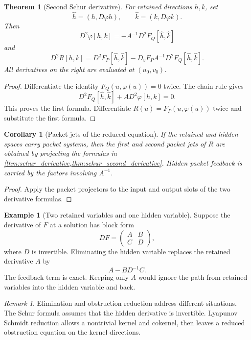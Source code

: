 \documentclass{aomart}
\newtheorem{theorem}{Theorem}[section]
\newtheorem{corollary}[corollary]{Corollary}
\theoremstyle{definition}
\newtheorem{example}[example]{Example}
\theoremstyle{remark}
\newtheorem{remark}[remark]{Remark}
\begin{document}
\begin{theorem}[Second Schur derivative]\label{thm:schur_second_derivative}
For retained directions $h,k$, set
\[
\widehat h=(h,D\varphi h),
\qquad
\widehat k=(k,D\varphi k).
\]
Then
\[
D^2\varphi[h,k]
=
-A^{-1}D^2F_Q[\widehat h,\widehat k]
\]
and
\[
D^2R[h,k]
=
D^2F_P[\widehat h,\widehat k]
-
D_vF_P A^{-1}D^2F_Q[\widehat h,\widehat k].
\]
All derivatives on the right are evaluated at $(u_0,v_0)$.
\end{theorem}

\begin{proof}
Differentiate the identity $F_Q(u,\varphi(u))=0$ twice.  The chain rule gives
\[
D^2F_Q[\widehat h,\widehat k]
+A D^2\varphi[h,k]
=0.
\]
This proves the first formula.  Differentiate $R(u)=F_P(u,\varphi(u))$ twice and substitute the first formula.
\end{proof}

\begin{corollary}[Packet jets of the reduced equation]\label{cor:reduced_packet_jets}
If the retained and hidden spaces carry packet systems, then the first and second packet jets of $R$ are obtained by projecting the formulas in \cref{thm:schur_derivative,thm:schur_second_derivative}.  Hidden packet feedback is carried by the factors involving $A^{-1}$.
\end{corollary}

\begin{proof}
Apply the packet projectors to the input and output slots of the two derivative formulas.
\end{proof}


\begin{example}[Two retained variables and one hidden variable]\label{ex:finite_schur}
Suppose the derivative of $F$ at a solution has block form
\[
DF=
\begin{pmatrix}
A&B\\
C&D
\end{pmatrix},
\]
where $D$ is invertible.  Eliminating the hidden variable replaces the retained derivative $A$ by
\[
A-BD^{-1}C.
\]
The feedback term is exact.  Keeping only $A$ would ignore the path from retained variables into the hidden variable and back.
\end{example}

\begin{remark}\label{rem:elimination_vs_obstruction}
Elimination and obstruction reduction address different situations.  The Schur formula assumes that the hidden derivative is invertible.  Lyapunov Schmidt reduction allows a nontrivial kernel and cokernel, then leaves a reduced obstruction equation on the kernel directions.
\end{remark}
\end{document}

